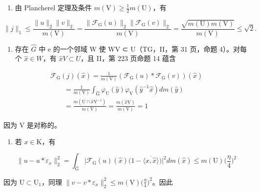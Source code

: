\begin{enumerate}
\def\labelenumi{\alph{enumi})}
\tightlist
\item
  由 Plancherel 定理及条件 \(m(\mathrm{V}) \geqslant \frac{1}{2}m(\mathrm{U})\)，有
\end{enumerate}

\[
\| j \| _ {1} \leqslant \frac {\| u \| _ {2} \| v \| _ {2}}{m (\mathrm{V})} = \frac {\| \mathcal {F} _ {\mathrm{G}} (u) \| _ {2} \| \mathcal {F} _ {\mathrm{G}} (v) \| _ {2}}{m (\mathrm{V})} = \frac {\sqrt {m (\mathrm{U}) m (\mathrm{V})}}{m (\mathrm{V})} \leqslant \sqrt {2}.
\]

\begin{enumerate}
\def\labelenumi{\alph{enumi})}
\setcounter{enumi}{1}
\tightlist
\item
  存在 \(\widehat{G}\) 中 e 的一个邻域 W 使 WV ⊂ U（TG，II，第 31 页，命题 4）。对每个 \(\widehat{x} \in W\)，有 \(\widehat{x}V \subset U\)，且 II，第 223 页命题 14 蕴含
\end{enumerate}

\[
\begin{array}{l} \mathcal {F} _ {\mathrm{G}} (j) (\widehat {x}) = \frac {1}{m (\mathrm{V})} (\mathcal {F} _ {\mathrm{G}} (u) * \mathcal {F} _ {\mathrm{G}} (v)) (\widehat {x}) \\ \qquad = \frac {1}{m (\mathrm{V})} \int_ {\widehat {\mathrm{G}}} \varphi_ {\mathrm{U}} (\widehat {y}) \varphi_ {\mathrm{V}} (\widehat {y} ^ {- 1} \widehat {x}) d m (\widehat {y}) \\ \qquad = \frac {m (\mathrm{U} \cap \widehat {x} \mathrm{V} ^ {- 1})}{m (\mathrm{V})} = \frac {m (\widehat {x} \mathrm{V})}{m (\mathrm{V})} = 1 \end{array}
\]

因为 V 是对称的。

\begin{enumerate}
\def\labelenumi{\alph{enumi})}
\setcounter{enumi}{2}
\tightlist
\item
  若 \(x \in \mathrm{K}\)，有
\end{enumerate}

\[
\| u - u * \varepsilon_ {x} \| _ {2} ^ {2} = \int_ {\widehat {\mathrm{G}}} \big | \mathcal {F} _ {\mathrm{G}} (u) (\widehat {x}) \big (1 - \overline {{\langle x , \widehat {x} \rangle}} \big) \big | ^ {2} d m (\widehat {x}) \leqslant m (\mathrm{U}) \Big (\frac {\eta}{4} \Big) ^ {2}
\]

因为 \(\mathrm{U}\subset \mathrm{U}_1\)，同理 \(\| v - v*\varepsilon_x\| _2^2\leqslant m(\mathrm{V})\big(\frac{\eta}{4}\big)^2\)。因此

